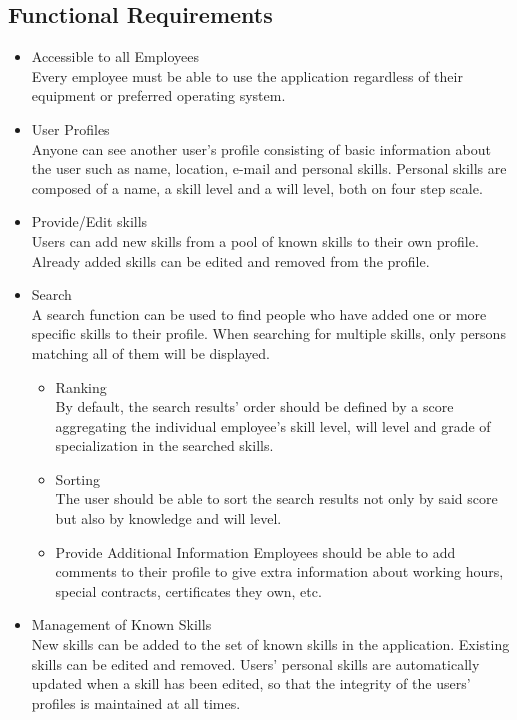 \subsection{Functional Requirements}
\begin{itemize}
 	\item Accessible to all Employees\\
	Every employee must be able to use the application regardless of their equipment or preferred operating system.
	\item User Profiles \\
	Anyone can see another user’s profile consisting of basic information about the user such as name, location, e-mail and personal skills. Personal skills are composed of a name, a skill level and a will level, both on four step scale.
	\item Provide/Edit skills\\
	Users can add new skills from a pool of known skills to their own profile. Already added skills can be edited and removed from the profile.
	\item Search\\
	A search function can be used to find people who have added one or more specific skills to their profile. When searching for multiple skills, only persons matching all of them will be displayed.
	\begin{itemize}
		\item Ranking\\
			By default, the search results' order should be defined by a score aggregating the individual employee's skill level, will level and grade of specialization in the searched skills.
		\item Sorting\\
			The user should be able to sort the search results not only by said score
			but also by knowledge and will level.
	\item Provide Additional Information
			Employees should be able to add comments to their profile to give extra information about working hours, special contracts, certificates they own, etc.
	\end{itemize}
	\item Management of Known Skills\\
	New skills can be added to the set of known skills in the application. Existing skills can be edited and removed. Users' personal skills are automatically updated when a skill has been edited, so that the integrity of the users' profiles is maintained at all times.
\end{itemize}

